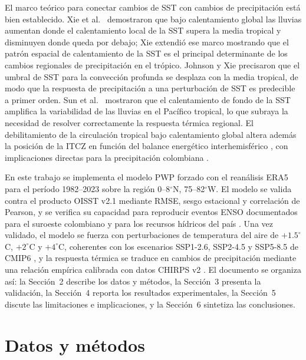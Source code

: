 \documentclass[12pt, a4paper]{article}
\begin{document}
El marco te\'orico para conectar cambios de SST con cambios de precipitaci\'on est\'a bien 
establecido. Xie et al.\ \cite{Xie2010} demostraron que bajo calentamiento global las 
lluvias aumentan donde el calentamiento local de la SST supera la media tropical y 
disminuyen donde queda por debajo; Xie \cite{Xie2020} extendi\'o ese marco mostrando que 
el patr\'on espacial de calentamiento de la SST es el principal determinante de los cambios 
regionales de precipitaci\'on en el tr\'opico. Johnson y Xie \cite{JohnsonXie2010} 
precisaron que el umbral de SST para la convecci\'on profunda se desplaza con la media 
tropical, de modo que la respuesta de precipitaci\'on a una perturbaci\'on de SST es 
predecible a primer orden. Sun et al.\ \cite{Sun2020} mostraron que el calentamiento de 
fondo de la SST amplifica la variabilidad de las lluvias en el Pac\'ifico tropical, lo que 
subraya la necesidad de resolver correctamente la respuesta t\'ermica regional. El 
debilitamiento de la circulaci\'on tropical bajo calentamiento global \cite{VecchiSoden2007} 
altera adem\'as la posici\'on de la ITCZ en funci\'on del balance energ\'etico 
interhemisf\'erico \cite{Schneider2014}, con implicaciones directas para la precipitaci\'on 
colombiana \cite{Poveda2004, Poveda2011}.

En este trabajo se implementa el modelo PWP forzado con el rean\'alisis ERA5 
\cite{Hersbach2020} para el per\'iodo 1982--2023 sobre la regi\'on 0--8$^{\circ}$N, 
75--82$^{\circ}$W. El modelo se valida contra el producto OISST v2.1 \cite{Huang2021} 
mediante RMSE, sesgo estacional y correlaci\'on de Pearson, y se verifica su capacidad 
para reproducir eventos ENSO documentados para el suroeste colombiano \cite{Ceron2021} 
y para los recursos h\'idricos del pa\'is \cite{MoralesMarın2026}. Una vez validado, el 
modelo se fuerza con perturbaciones de temperatura del aire de $+1.5^{\circ}$C, 
$+2^{\circ}$C y $+4^{\circ}$C, coherentes con los escenarios SSP1-2.6, SSP2-4.5 y 
SSP5-8.5 de CMIP6 \cite{Eyring2016}, y la respuesta t\'ermica se traduce en cambios de 
precipitaci\'on mediante una relaci\'on emp\'irica calibrada con datos CHIRPS v2 
\cite{Funk2015}. El documento se organiza as\'i: la Secci\'on~2 describe los datos y 
m\'etodos, la Secci\'on~3 presenta la validaci\'on, la Secci\'on~4 reporta los resultados 
experimentales, la Secci\'on~5 discute las limitaciones e implicaciones, y la Secci\'on~6 
sintetiza las conclusiones.

\section{Datos y m\'etodos}
\end{document}
